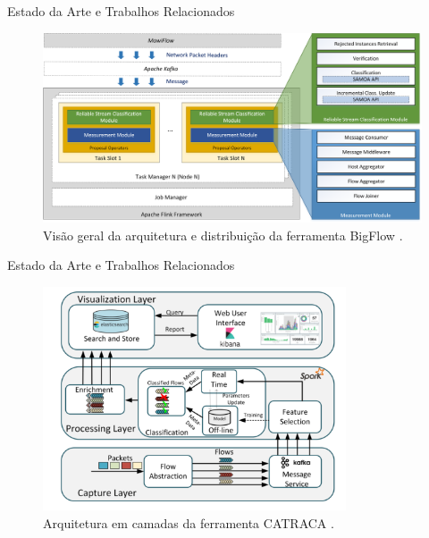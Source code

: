 \documentclass[aspectratio=43,10pt]{beamer}
\begin{document}
\begin{frame}[fragile]{Estado da Arte e Trabalhos Relacionados}
\begin{figure}[ht]
  \centering
  \includegraphics[width=\textwidth]{figuras/bigflow-fig5-bigflow_arch.png}
  \caption{Visão geral da arquitetura e distribuição da ferramenta BigFlow \cite{Viegas2019}.}
  \label{fig:bigflow-arch}
\end{figure}
\end{frame}
\begin{frame}[fragile]{Estado da Arte e Trabalhos Relacionados}
\begin{figure}[ht]
  \centering
  \includegraphics[width=0.8\textwidth]{figuras/catraca-arch.png}
  \caption{Arquitetura em camadas da ferramenta CATRACA \cite{Lopez2018}.}
  \label{fig:catraca}
\end{figure}
\end{frame}
\end{document}
